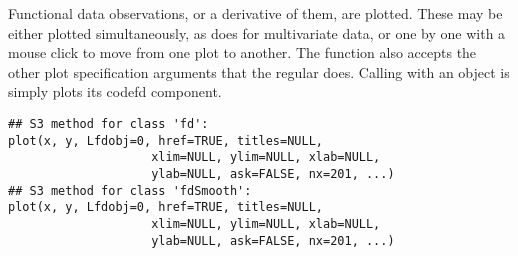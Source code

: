\begin{Description}\relax
Functional data observations, or a derivative of them, are plotted.
These may be either plotted simultaneously, as  does for
multivariate data, or one by one with a mouse click to move from one
plot to another.  The function also accepts the other plot
specification arguments that the regular  does.  Calling
 with an  object is simply plots its
code{fd} component.
\end{Description}
\begin{Usage}
\begin{verbatim}
## S3 method for class 'fd':
plot(x, y, Lfdobj=0, href=TRUE, titles=NULL,
                    xlim=NULL, ylim=NULL, xlab=NULL,
                    ylab=NULL, ask=FALSE, nx=201, ...)
## S3 method for class 'fdSmooth':
plot(x, y, Lfdobj=0, href=TRUE, titles=NULL,
                    xlim=NULL, ylim=NULL, xlab=NULL,
                    ylab=NULL, ask=FALSE, nx=201, ...)
\end{verbatim}
\end{Usage}
